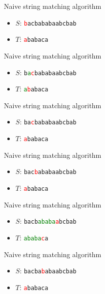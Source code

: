\documentclass{beamer}
\begin{document}
	
	\begin{frame}[plain]{Naive string matching algorithm}
		\begin{itemize}
			\item $S$: \texttt{\textcolor{red}{b}acbababaabcbab}
			\item $T$: \phantom{\texttt{}}\texttt{\textcolor{red}{a}babaca}
		\end{itemize}
	\end{frame}
	\begin{frame}[plain]{Naive string matching algorithm}
		\begin{itemize}
			\item $S$: \texttt{b\textcolor{green}{a}\textcolor{red}{c}bababaabcbab}
			\item $T$: \texttt{\textcolor{green}{a}\textcolor{red}{b}abaca}
		\end{itemize}
	\end{frame}
	\begin{frame}[plain]{Naive string matching algorithm}
		\begin{itemize}
			\item $S$: \texttt{ba\textcolor{red}{c}bababaabcbab}
			\item $T$: \texttt{\textcolor{red}{a}babaca}
		\end{itemize}
	\end{frame}
	\begin{frame}[plain]{Naive string matching algorithm}
		\begin{itemize}
			\item $S$: \texttt{bac\textcolor{red}{b}ababaabcbab}
			\item $T$: \texttt{\textcolor{red}{a}babaca}
		\end{itemize}
	\end{frame}
	\begin{frame}[plain]{Naive string matching algorithm}
		\begin{itemize}
			\item $S$: \texttt{bacb\textcolor{green}{ababa}\textcolor{red}{a}bcbab}
			\item $T$: \texttt{\textcolor{green}{ababa}\textcolor{red}{c}a}
		\end{itemize}
	\end{frame}
	\begin{frame}[plain]{Naive string matching algorithm}
		\begin{itemize}
			\item $S$: \texttt{bacba\textcolor{red}{b}abaabcbab}
			\item $T$: \texttt{\textcolor{red}{a}babaca}
		\end{itemize}
	\end{frame}
\end{document}

